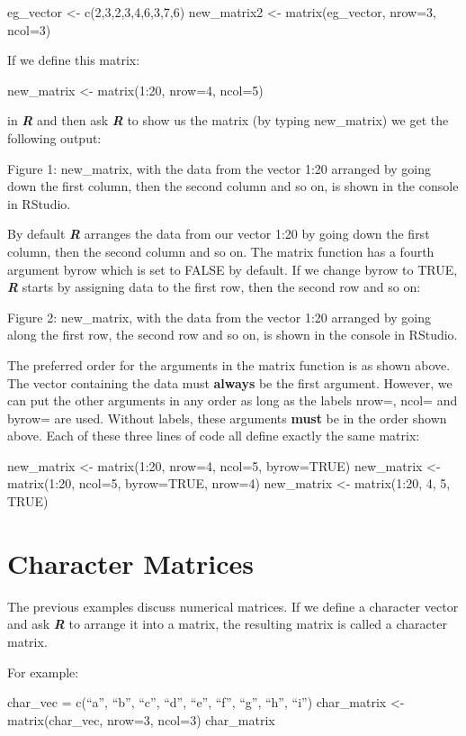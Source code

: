 \documentclass[
]{book}
\begin{document}
eg\_vector \textless- c(2,3,2,3,4,6,3,7,6)
new\_matrix2 \textless- matrix(eg\_vector, nrow=3, ncol=3)

If we define this matrix:

new\_matrix \textless- matrix(1:20, nrow=4, ncol=5)

in \textbf{\emph{R}} and then ask \textbf{\emph{R}} to show us the matrix (by typing new\_matrix) we get the following output:

Figure 1: new\_matrix, with the data from the vector 1:20 arranged by going down the first column, then the second column and so on, is shown in the console in RStudio.

By default \textbf{\emph{R}} arranges the data from our vector 1:20 by going down the first column, then the second column and so on. The matrix function has a fourth argument byrow which is set to FALSE by default. If we change byrow to TRUE, \textbf{\emph{R}} starts by assigning data to the first row, then the second row and so on:

Figure 2: new\_matrix, with the data from the vector 1:20 arranged by going along the first row, the second row and so on, is shown in the console in RStudio.

The preferred order for the arguments in the matrix function is as shown above. The vector containing the data must \textbf{always} be the first argument. However, we can put the other arguments in any order as long as the labels nrow=, ncol= and byrow= are used. Without labels, these arguments \textbf{must} be in the order shown above. Each of these three lines of code all define exactly the same matrix:

new\_matrix \textless- matrix(1:20, nrow=4, ncol=5, byrow=TRUE)
new\_matrix \textless- matrix(1:20, ncol=5, byrow=TRUE, nrow=4)
new\_matrix \textless- matrix(1:20, 4, 5, TRUE)

\section{Character Matrices}\label{character-matrices}

The previous examples discuss numerical matrices. If we define a character vector and ask \textbf{\emph{R}} to arrange it into a matrix, the resulting matrix is called a character matrix.

For example:

char\_vec = c(``a'', ``b'', ``c'', ``d'', ``e'', ``f'', ``g'', ``h'', ``i'')
char\_matrix \textless- matrix(char\_vec, nrow=3, ncol=3)
char\_matrix
\end{document}
